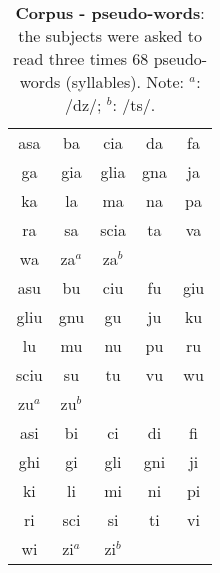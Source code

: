 \begin{table}[htbp]
  \begin{center}
  \begin{scriptsize}
	\begin{tabular}{ccccc}
	  \hline
	  asa & ba & cia & da & fa\\
	  ga & gia & glia & gna & ja\\
	  ka & la & ma & na & pa\\
	  ra & sa & scia & ta & va\\
	  wa & za$^a$ & za$^b$ & &\\
	  \hline
	  asu & bu & ciu & fu & giu\\
	  gliu & gnu & gu & ju & ku\\
	  lu & mu & nu & pu & ru\\
	  sciu & su & tu & vu & wu\\
	  zu$^a$ & zu$^b$ & &\\
	  \hline
	  asi & bi & ci & di & fi\\
	  ghi & gi & gli & gni & ji\\
	  ki & li & mi & ni & pi\\
	  ri & sci &  si & ti & vi\\ 
	  wi & zi$^a$ & zi$^b$ & &\\
	  \hline
  \end{tabular}
  \end{scriptsize}
  \end{center}
	\caption[Corpus - pseudo-words]{\textbf{Corpus - pseudo-words}:
	the subjects were asked to read three times 68 pseudo-words (syllables).
	Note: $^a$: /dz/; $^b$: /ts/.}
 \label{tab:experiments:stimuli:ss}
\end{table}

